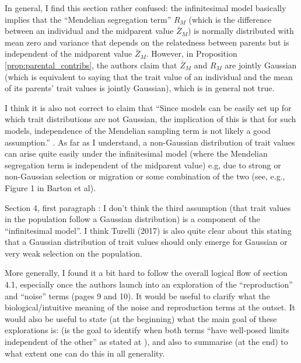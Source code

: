 \reply{
}

\begin{point}{}
    In general, I find this section rather confused: the infinitesimal model basically implies that the ``Mendelian segregation term'' $R_{M}$ (which is the difference between an individual and the midparent value $\bar{Z}_{M}$) is normally distributed with mean zero and variance that depends on the relatedness between parents but is independent of the midparent value $\bar{Z}_{M}$. However, in Proposition \ref{prop:parental_contribs}, the authors claim that $\bar{Z}_{M}$ and $R_{M}$ are jointly Gaussian (which is equivalent to saying that the trait value of an individual and the mean of its parents' trait values is jointly Gaussian), which is in general not true.
\end{point}

\reply{
}

\begin{point}{}
    I think it is also not correct to claim that ``Since models can be easily set up for which trait distributions are not Gaussian, the implication of this is that for such models, independence of the Mendelian sampling term is not likely a good assumption.'' \revref. As far as I understand, a non-Gaussian distribution of trait values can arise quite easily under the infinitesimal model (where the Mendelian segregation term is independent of the midparent value) e.g, due to strong or non-Gaussian selection or migration or some combination of the two (see, e.g., Figure 1 in Barton et al).
\end{point}

\reply{
}

\begin{point}{}
    Section 4, first paragraph \revref: I don't think the third assumption (that trait values in the population follow a Gaussian distribution) is a component of the ``infinitesimal model''. I think Turelli (2017) is also quite clear about this stating that a Gaussian distribution of trait values should only emerge for Gaussian or very weak selection on the population.
\end{point}

\reply{
}

\begin{point}{}
More generally, I found it a bit hard to follow the overall logical flow of section 4.1, especially once the authors launch into an exploration of the ``reproduction'' and ``noise'' terms (pages 9 and 10).
    It would be useful to clarify what the biological/intuitive meaning of the noise and reproduction terms at the outset. It would also be useful to state (at the beginning) what the main goal of these explorations is: (is the goal to identify when both terms ``have well-posed limits independent of the other'' as stated at ), and also to summarise (at the end) to what extent one can do this in all generality.
\end{point}

